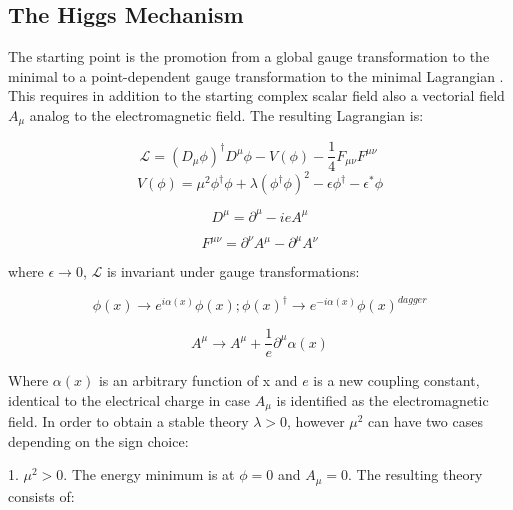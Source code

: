 \subsection{The Higgs Mechanism}
\label{higgs_mechanism}

The starting point is the promotion from a global gauge transformation to the minimal to a point-dependent gauge transformation to the minimal Lagrangian . This requires in addition to the starting complex scalar field also a vectorial field $A_{\mu}$ analog to the electromagnetic field. The resulting Lagrangian is:

\begin{equation}
\mathcal{L} = (D_{\mu}\phi)^{\dagger} D^{\mu}\phi - V (\phi) - \dfrac{1}{4}F_{\mu\nu}F^{\mu\nu}\
\label{eq::lagrangian_min}
\end{equation}
\begin{equation}
V(\phi)=\mu^{2}\phi^{\dagger}\phi+\lambda(\phi^{\dagger}\phi)^{2} -\epsilon\phi^{\dagger} -\epsilon^{*}\phi
\end{equation}

\begin{equation}
D^{\mu} = \partial^{\mu} - ieA^{\mu}
\end{equation}

\begin{equation}
F^{\mu\nu} =\partial^{\nu}A^{\mu} - \partial^{\mu}A^{\nu}
\end{equation}

where $\epsilon \rightarrow 0$, $\mathcal{L}$ is invariant under gauge transformations:

\begin{equation}
\phi(x) \rightarrow e^{i\alpha(x)}\phi(x); \phi(x)^{\dagger} \rightarrow e ^{-i\alpha(x)}\phi(x)^{dagger}
\end{equation}

\begin{equation}
A^{\mu} \rightarrow A^{\mu} + \dfrac{1}{e}\partial^{\mu}\alpha(x)
\label{eq::a_tranform}
\end{equation}

Where $\alpha(x)$ is an arbitrary function of x and $e$ is a new coupling constant, identical to the electrical charge in case $A_{\mu}$ is identified as the electromagnetic field. In order to obtain a stable theory $\lambda > 0$, however $\mu^{2}$ can have two cases depending on the sign choice:
 
1. $\mu^{2} > 0$. The energy minimum is at $\phi = 0$ and $A_{\mu} = 0$. The resulting theory consists of:

